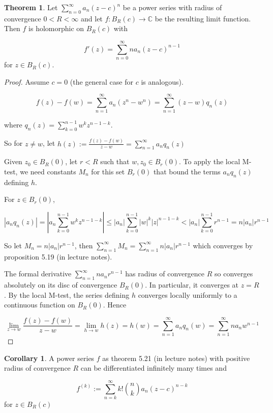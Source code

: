 \documentclass[12pt,a4paper]{article}
\theoremstyle{definition}
\newtheorem{theorem}[definition]{Theorem}
\newtheorem{corollary}[definition]{Corollary}
\begin{document}
\begin{theorem}
	Let $\sum_{n = 0}^{\infty} a_n {(z - c)}^n$ be a power series with radius of convergence $0 < R < \infty$ and let $f: B_R(c) \rightarrow \mathbb{C}$ be the resulting limit function. Then $f$ is holomorphic on $B_R(c)$ with

	\[f'(z) = \sum_{n = 0}^{\infty} n a_n {(z - c)}^{n - 1}\] for $z \in B_R(c)$.
\end{theorem}

\begin{proof}
	Assume $c = 0$ (the general case for $c$ is analogous).

	\[f(z) - f(w) = \sum_{n = 1}^{\infty} a_n (z^n - w^n) = \sum_{n = 1}^{\infty} (z - w) q_n(z)\]
	
	where $q_n(z) = \sum_{k = 0}^{n - 1} w^k z^{n - 1 - k}$.

	So for $z \ne w$, let $h(z) := \frac{f(z) - f(w)}{z - w} = \sum_{n = 1}^{\infty} a_n q_n(z)$

	Given $z_0 \in B_R(0)$, let $r < R$ such that $w, z_0 \in B_r(0)$. To apply the local M-test, we need constants $M_n$ for this set $B_r(0)$ that bound the terms $a_n q_n(z)$ defining $h$.

	For $z \in B_r(0)$,

	\[|a_n q_n(z)| = |a_n \sum_{k = 0}^{n - 1} w^k z^{n - 1 - k}| \le |a_n| \sum_{k = 0}^{n - 1} |w|^k |z|^{n - 1 - k} < |a_n| \sum_{k = 0}^{n - 1} r^{n - 1} = n |a_n| r^{n - 1}\]

	So let $M_n = n|a_n| r^{n - 1}$, then $\sum_{n = 1}^{\infty} M_n = \sum_{n = 1}^{\infty} n|a_n| r^{n - 1}$ which converges by proposition 5.19 (in lecture notes).

	The formal derivative $\sum_{n = 1}^{\infty} n a_n r^{n - 1}$ has radius of convergence $R$ so converges absolutely on its disc of convergence $B_R(0)$. In particular, it converges at $z = R$. By the local M-test, the series defining $h$ converges locally uniformly to a continuous function on $B_R(0)$. Hence
	
	\[\lim_{z \rightarrow w} \frac{f(z) - f(w)}{z - w} = \lim_{h \rightarrow w} h(z) = h(w) = \sum_{n = 1}^{\infty} a_n q_n(w) = \sum_{n = 1}^{\infty} n a_n w^{n - 1}\]
\end{proof}

\begin{corollary}
	A power series $f$ as theorem 5.21 (in lecture notes) with positive radius of convergence $R$ can be differentiated infinitely many times and
	
	\[f^{(k)} := \sum_{n = k}^{\infty} k! {n \choose k} a_n {(z - c)}^{n - k}\] for $z \in B_R(c)$
\end{corollary}
\end{document}
